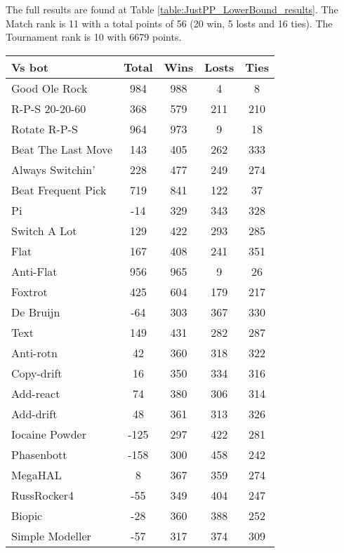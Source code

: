 The full results are found at Table \ref{table:JustPP_LowerBound_results}. The Match rank is 11 with a total points of 56 (20 win, 5 losts and 16 ties). The Tournament rank is 10 with 6679 points.

\begin{table*}
    \caption{HBSP (WS=1 to WS=29) Lower Bound results}
    \label{table:JustPP_LowerBound_results}
    \centering
    \begin{tabular}{|l|c|c|c|c|}
        \hline
        \textbf{Vs bot} & \textbf{Total} & \textbf{Wins} & \textbf{Losts} & \textbf{Ties} \\ \hline
Good Ole Rock & 984 & 988 & 4 & 8 \\ \hline 
R-P-S 20-20-60 & 368 & 579 & 211 & 210 \\ \hline 
Rotate R-P-S & 964 & 973 & 9 & 18 \\ \hline 
Beat The Last Move & 143 & 405 & 262 & 333 \\ \hline 
Always Switchin' & 228 & 477 & 249 & 274 \\ \hline 
Beat Frequent Pick & 719 & 841 & 122 & 37 \\ \hline 
Pi & -14 & 329 & 343 & 328 \\ \hline 
Switch A Lot & 129 & 422 & 293 & 285 \\ \hline 
Flat & 167 & 408 & 241 & 351 \\ \hline 
Anti-Flat & 956 & 965 & 9 & 26 \\ \hline 
Foxtrot & 425 & 604 & 179 & 217 \\ \hline 
De Bruijn & -64 & 303 & 367 & 330 \\ \hline 
Text & 149 & 431 & 282 & 287 \\ \hline 
Anti-rotn & 42 & 360 & 318 & 322 \\ \hline 
Copy-drift & 16 & 350 & 334 & 316 \\ \hline 
Add-react & 74 & 380 & 306 & 314 \\ \hline 
Add-drift & 48 & 361 & 313 & 326 \\ \hline 
Iocaine Powder & -125 & 297 & 422 & 281 \\ \hline 
Phasenbott & -158 & 300 & 458 & 242 \\ \hline 
MegaHAL & 8 & 367 & 359 & 274 \\ \hline 
RussRocker4 & -55 & 349 & 404 & 247 \\ \hline 
Biopic & -28 & 360 & 388 & 252 \\ \hline 
Simple Modeller & -57 & 317 & 374 & 309 \\ \hline 

\end{tabular}
\end{table*}
